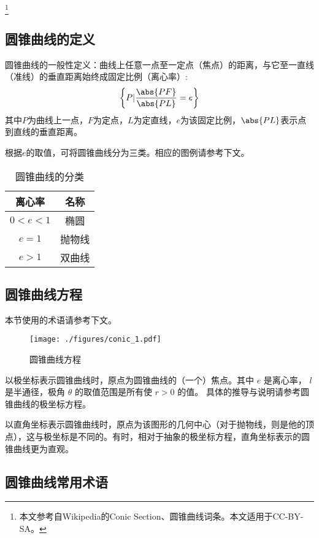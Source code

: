
\begin{issues}
\issueDraft
\end{issues}
\footnote{本文参考自Wikipedia的Conic Section、圆锥曲线词条。本文适用于CC-BY-SA。}

\subsection{圆锥曲线的定义}
圆锥曲线的一般性定义：曲线上任意一点至一定点（焦点）的距离，与它至一直线（准线）的垂直距离始终成固定比例（离心率）:
\begin{equation}
\left \{P \vert \frac{\abs{PF}}{\abs{PL}}=e \right \}
\end{equation}
其中$P$为曲线上一点，$F$为定点，$L$为定直线，$e$为该固定比例，$\abs{PL}$表示点到直线的垂直距离。

根据$e$的取值，可将圆锥曲线分为三类。相应的图例请参考下文。
\begin{table}[ht]
\centering
\caption{圆锥曲线的分类}\label{conic_tab2}
\begin{tabular}{|c|c|}
\hline
离心率 & 名称\\
\hline
$0<e<1$ & 椭圆\\
\hline
$e=1$ & 抛物线\\
\hline
$e>1$ & 双曲线\\
\hline
\end{tabular}
\end{table}

\subsection{圆锥曲线方程}
本节使用的术语请参考下文。
\begin{figure}[ht]
\centering
\texttt{[image: ./figures/conic\_1.pdf]}
\caption{圆锥曲线方程} \label{conic_fig1}
\end{figure}

以极坐标表示圆锥曲线时，原点为圆锥曲线的（一个）焦点。其中 $e$ 是离心率， $l$ 是半通径，极角 $\theta$ 的取值范围是所有使 $r>0$ 的值。 
具体的推导与说明请参考圆锥曲线的极坐标方程。

以直角坐标表示圆锥曲线时，原点为该图形的几何中心（对于抛物线，则是他的顶点），这与极坐标是不同的。有时，相对于抽象的极坐标方程，直角坐标表示的圆锥曲线更为直观。

\subsection{圆锥曲线常用术语}

